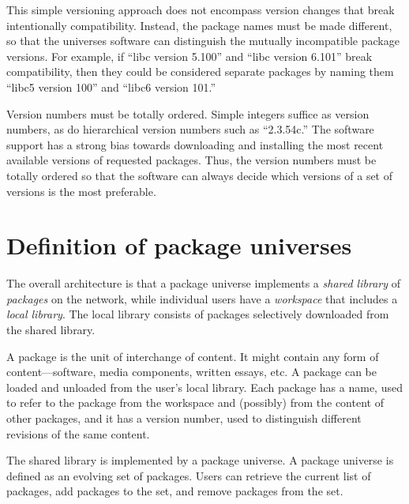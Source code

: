 \documentclass{article}
\begin{document}
This simple versioning approach does not encompass version changes
that break intentionally compatibility.  Instead, the package names
must be made different, so that the universes software can distinguish
the mutually incompatible package versions.  For example, if ``libc
version 5.100'' and ``libc version 6.101'' break compatibility, then
they could be considered separate packages by naming them ``libc5
version 100'' and ``libc6 version 101.''


Version numbers must be totally ordered.  Simple integers suffice as
version numbers, as do hierarchical version numbers such as
``2.3.54c.''  The software support has a strong bias towards
downloading and installing the most recent available versions of
requested packages.  Thus, the version numbers must be totally ordered
so that the software can always decide which versions of a set of
versions is the most preferable.



\section{Definition of package universes}

The overall architecture is that a package universe implements a
\emph{shared library} of \emph{packages} on the network, while
individual users have a \emph{workspace} that includes a \emph{local
library}.  The local library consists of packages selectively
downloaded from the shared library.

A package is the unit of interchange of content.  It might contain any
form of content---software, media components, written essays, etc.  A
package can be loaded and unloaded from the user's local library.
Each package has a name, used to refer to the package from the
workspace and (possibly) from the content of other packages, and it
has a version number, used to distinguish different revisions of the same
content.

The shared library is implemented by a package universe.  A package
universe is defined as an evolving set of packages.  Users can
retrieve the current list of packages, add packages to the set, and
remove packages from the set.
\end{document}
